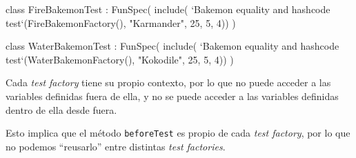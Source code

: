   \begin{kotlin}
    class FireBakemonTest : FunSpec({
      include(
        `Bakemon equality and hashcode test`(FireBakemonFactory(), "Karmander", 25, 5, 4))
    })
  \end{kotlin}

  \begin{kotlin}
    class WaterBakemonTest : FunSpec({
      include(
        `Bakemon equality and hashcode test`(WaterBakemonFactory(), "Kokodile", 25, 5, 4))
    })
  \end{kotlin}

  \begin{important}
    Cada \textit{test factory} tiene su propio contexto, por lo que no puede acceder a las variables
    definidas fuera de ella, y no se puede acceder a las variables definidas dentro de ella desde
    fuera.

    Esto implica que el método \texttt{beforeTest} es propio de cada \textit{test factory}, por lo
    que no podemos \enquote{reusarlo} entre distintas \textit{test factories}.
  \end{important}